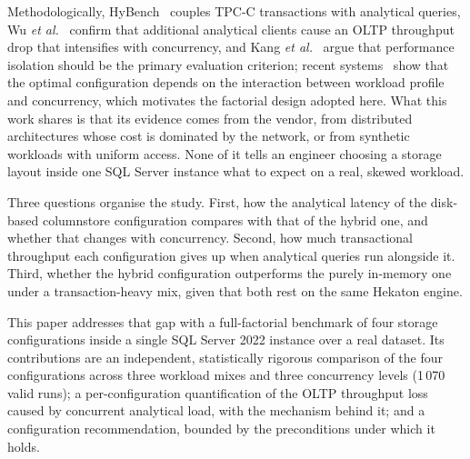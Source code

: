 \documentclass[10pt,conference,a4paper]{IEEEtran}
\begin{document}
Methodologically, HyBench~\cite{zhang2024hybench} couples TPC-C transactions
with analytical queries, Wu \emph{et al.}~\cite{wu2025} confirm that
additional analytical clients cause an OLTP throughput drop that intensifies
with concurrency, and Kang \emph{et al.}~\cite{kang2023} argue that
performance isolation should be the primary evaluation criterion; recent
systems~\cite{zhao2025pushtap, zhang2025synchro, chen2025vedb} show that the
optimal configuration depends on the interaction between workload profile
and concurrency, which motivates the factorial design adopted here.
What this work shares is that its evidence comes from the vendor, from
distributed architectures whose cost is dominated by the network, or from
synthetic workloads with uniform access. None of it tells an engineer
choosing a storage layout inside one SQL Server instance what to expect on a
real, skewed workload.

Three questions organise the study. First, how the analytical latency of
the disk-based columnstore configuration compares with that of the hybrid
one, and whether that changes with concurrency. Second, how much
transactional throughput each configuration gives up when analytical queries
run alongside it. Third, whether the hybrid configuration outperforms the
purely in-memory one under a transaction-heavy mix, given that both rest on
the same Hekaton engine.

This paper addresses that gap with a full-factorial benchmark of four
storage configurations inside a single SQL Server 2022 instance over a real
dataset. Its contributions are an independent, statistically rigorous
comparison of the four configurations across three workload mixes and three
concurrency levels (1\,070 valid runs); a per-configuration quantification of
the OLTP throughput loss caused by concurrent analytical load, with the
mechanism behind it; and a configuration recommendation, bounded by the
preconditions under which it holds.


\end{document}
